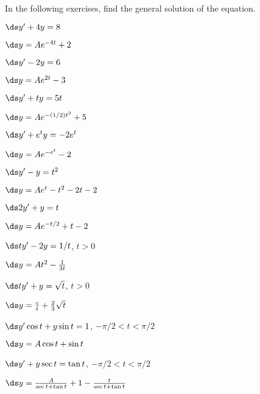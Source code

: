\begin{enumialphparenastyle}

In the following exercises, find the general solution of the equation.

\begin{ex}
 $\ds y' +4y=8$
\begin{sol}
 $\ds y=Ae^{-4t}+2$
\end{sol}
\end{ex}


\begin{ex}
 $\ds y'-2y=6$
\begin{sol}
 $\ds y=Ae^{2t}-3$
\end{sol}
\end{ex}


\begin{ex}
 $\ds y' +ty=5t$
\begin{sol}
 $\ds y=Ae^{-(1/2)t^2}+5$
\end{sol}
\end{ex}


\begin{ex}
 $\ds y'+e^ty=-2e^t$
\begin{sol}
 $\ds y=Ae^{-e^t}-2$
\end{sol}
\end{ex}


\begin{ex}
 $\ds y'-y=t^2$
\begin{sol}
 $\ds y=Ae^{t}-t^2-2t-2$
\end{sol}
\end{ex}


\begin{ex}
 $\ds 2y' +y=t$
\begin{sol}
 $\ds y=Ae^{-t/2}+t-2$
\end{sol}
\end{ex}


\begin{ex}
 $\ds ty' -2y=1/t$, $t>0$
\begin{sol}
 $\ds y=At^2-{1\over3t}$
\end{sol}
\end{ex}


\begin{ex}
 $\ds ty'+y=\sqrt{t}$, $t>0$
\begin{sol}
 $\ds y={c\over t}+{2\over3}\sqrt t$
\end{sol}
\end{ex}


\begin{ex}
 $\ds y'\cos t+y\sin t=1$, $-\pi/2<t<\pi/2$
\begin{sol}
 $\ds y= A\cos t+\sin t$
\end{sol}
\end{ex}


\begin{ex}
 $\ds y' + y\sec t=\tan t$, $-\pi/2<t<\pi/2$
\begin{sol}
 $\ds y= {A\over\sec t+\tan t}+1-{t\over\sec t+\tan t}$
\end{sol}
\end{ex}

\end{enumialphparenastyle}